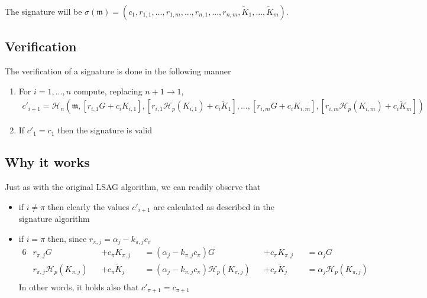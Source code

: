 The signature will be \(\sigma(\mathfrak{m}) = (c_1, r_{1, 1}, ..., r_{1, m}, ..., r_{n, 1}, ..., r_{n, m}, \tilde{K}_1, ...,  \tilde{K}_m) \).

\subsection*{Verification}

The verification of a signature is done in the following manner

\begin{enumerate}
	\item  For \(i = 1, ..., n\) compute, replacing \(n + 1 \rightarrow 1\),\\
	\begin{align*}
	c'_{i+1} = \mathcal{H}_n(\mathfrak{m}, [r_{i, 1} G + c_i K_{i, 1}], [r_{i, 1} \mathcal{H}_p(K_{i, 1}) + c_i \tilde{K}_1], 
	..., [r_{i, m} G + c_i K_{i, m}], [r_{i, m} \mathcal{H}_p(K_{i, m}) + c_i \tilde{K}_m]) 
	\end{align*}
	
	\item If \(c'_1 = c_1\) then the signature is valid
\end{enumerate}


\subsection*{Why it works}

Just as with the original LSAG algorithm, we can readily observe that

\begin{itemize}

\item[] if \(i \ne \pi \) then clearly the values \(c'_{i + 1}\) are calculated as described in the signature algorithm

\item[] if \(i = \pi\) then, since \(r_{\pi, j} = \alpha_j -k_{\pi, j} c_\pi \)\\
\begin{alignat*}{6}  
  &r_{\pi, j} G &&+ c_\pi K_{\pi,j}                              
                   &&= (\alpha_j - k_{\pi, j} c_\pi) G &&+ c_\pi K_{\pi,j}
                   &&= \alpha_j G \\  
  &r_{\pi, j} \mathcal{H}_p(K_{\pi, j}) &&+ c_\pi \tilde{K}_j  
                   &&= (\alpha_j - k_{\pi, j} c_\pi) \mathcal{H}_p(K_{\pi, j}) &&+ c_\pi \tilde{K}_j
                   &&= \alpha_j \mathcal{H}_p(K_{\pi, j})\\ 
\end{alignat*}
   In other words, it holds also that \(c'_{\pi + 1} = c_{\pi+1}\) 

\end{itemize}


